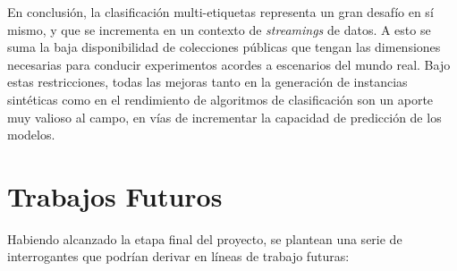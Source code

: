 En conclusión, la clasificación multi-etiquetas representa un gran desafío en sí
mismo, y que se incrementa en un contexto de \textit{streamings} de datos. A
esto se suma la baja disponibilidad de colecciones públicas que tengan las
dimensiones necesarias para conducir experimentos acordes a escenarios del mundo
real. Bajo estas restricciones, todas las mejoras tanto en la generación de
instancias sintéticas como en el rendimiento de algoritmos de clasificación son
un aporte muy valioso al campo, en vías de incrementar la capacidad de
predicción de los modelos.

\section{Trabajos Futuros}

Habiendo alcanzado la etapa final del proyecto, se plantean una serie de
interrogantes que podrían derivar en líneas de trabajo futuras:


